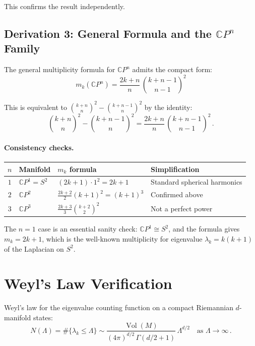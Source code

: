 \documentclass[11pt]{article}
\theoremstyle{remark}
\begin{document}
This confirms the result independently.

\subsection{Derivation 3: General Formula and the $\mathbb{C}P^n$ Family}

The general multiplicity formula for $\mathbb{C}P^n$ admits the compact form:
\begin{equation}
\boxed{m_k(\mathbb{C}P^n) = \frac{2k+n}{n}\,\binom{k+n-1}{n-1}^{\!2}}
\end{equation}

\noindent
This is equivalent to $\binom{k+n}{n}^2 - \binom{k+n-1}{n}^2$ by the
identity:
\begin{equation}
\binom{k+n}{n}^{\!2} - \binom{k+n-1}{n}^{\!2}
= \frac{2k+n}{n}\,\binom{k+n-1}{n-1}^{\!2}\,.
\end{equation}

\paragraph{Consistency checks.}
\begin{center}
\begin{tabular}{clll}
\toprule
$n$ & Manifold & $m_k$ formula & Simplification \\
\midrule
$1$ & $\mathbb{C}P^1 = S^2$ & $(2k+1)\cdot 1^2 = 2k+1$
    & Standard spherical harmonics \\
$2$ & $\mathbb{C}P^2$ & $\frac{2k+2}{2}(k+1)^2 = (k+1)^3$
    & Confirmed above \\
$3$ & $\mathbb{C}P^3$ & $\frac{2k+3}{3}\binom{k+2}{2}^2$
    & Not a perfect power \\
\bottomrule
\end{tabular}
\end{center}

The $n=1$ case is an essential sanity check: $\mathbb{C}P^1 \cong S^2$, and
the formula gives $m_k = 2k+1$, which is the well-known multiplicity for
eigenvalue $\lambda_k = k(k+1)$ of the Laplacian on $S^2$.

\section{Weyl's Law Verification}

Weyl's law for the eigenvalue counting function on a compact Riemannian
$d$-manifold states:
\begin{equation}
N(\Lambda) = \#\{\lambda_k \leq \Lambda\}
\sim \frac{\operatorname{Vol}(M)}{(4\pi)^{d/2}\,\Gamma(d/2+1)}\,
\Lambda^{d/2}
\quad\text{as }\Lambda\to\infty\,.
\end{equation}
\end{document}
